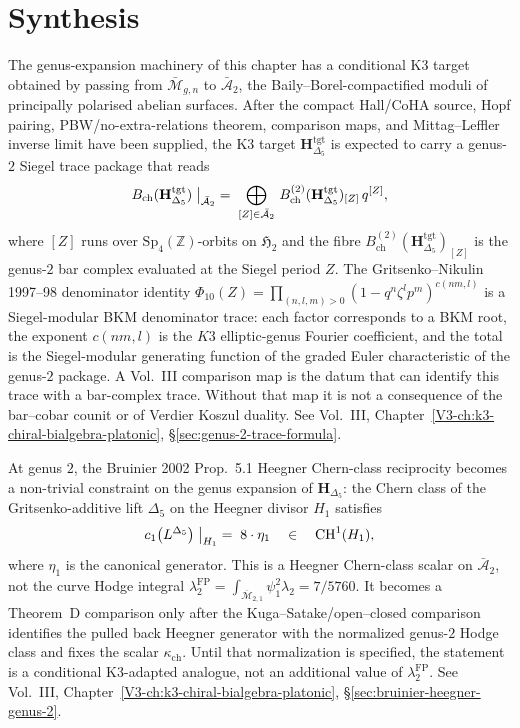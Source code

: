 \section{Synthesis}
\label{sec:gexp-supplement}

\begin{remark}
\label{rem:gexp-1}
The genus-expansion machinery of this chapter has a conditional K3
target obtained by passing from $\bar{\mathcal M}_{g,n}$ to
$\bar{\mathcal A}_2$, the Baily--Borel-compactified moduli of
principally polarised abelian surfaces. After the compact Hall/CoHA
source, Hopf pairing, PBW/no-extra-relations theorem, comparison
maps, and Mittag--Leffler inverse limit have been supplied, the
K3 target $\mathbf H_{\Delta_5}^{\mathrm{tgt}}$ is expected to carry
a genus-$2$ Siegel trace package that reads
\[
B_{\mathrm{ch}}(\mathbf H_{\Delta_5}^{\mathrm{tgt}})\bigm|_{\bar{\mathcal A}_2}
\;=\; \bigoplus_{[Z]\in\bar{\mathcal A}_2}\, B_{\mathrm{ch}}^{(2)}(\mathbf H_{\Delta_5}^{\mathrm{tgt}})_{[Z]}\, q^{[Z]},
\]
where $[Z]$ runs over $\mathrm{Sp}_4(\mathbb Z)$-orbits on $\mathfrak H_2$
and the fibre $B^{(2)}_{\mathrm{ch}}(\mathbf H_{\Delta_5}^{\mathrm{tgt}})_{[Z]}$ is the
genus-$2$ bar complex evaluated at the Siegel period $Z$. The
Gritsenko--Nikulin 1997--98 denominator identity
$\Phi_{10}(Z) = \prod_{(n,l,m)>0}(1 - q^n\zeta^l p^m)^{c(nm,l)}$
is a Siegel-modular BKM denominator trace: each factor corresponds to
a BKM root, the exponent $c(nm,l)$ is the $K3$ elliptic-genus Fourier
coefficient, and the total is the Siegel-modular generating function
of the graded Euler characteristic of the genus-$2$ package. A Vol.~III
comparison map is the datum that can identify this trace with a
bar-complex trace. Without that map it is not a consequence of the
bar--cobar counit or of Verdier Koszul duality. See Vol.~III,
Chapter~\ref{V3-ch:k3-chiral-bialgebra-platonic},
\S\ref{sec:genus-2-trace-formula}.
\end{remark}

\begin{remark}
\label{rem:gexp-2}
At genus $2$, the Bruinier 2002 Prop.~5.1 Heegner Chern-class
reciprocity becomes a non-trivial constraint on the genus expansion
of $\mathbf H_{\Delta_5}$: the Chern class of the Gritsenko-additive
lift $\Delta_5$ on the Heegner divisor $H_1$ satisfies
\[
c_1\bigl(L^{\Delta_5}\bigr)\bigm|_{H_1}
\;=\; 8\cdot \eta_1
\quad\in\quad \mathrm{CH}^1(H_1),
\]
where $\eta_1$ is the canonical generator. This is a Heegner
Chern-class scalar on $\bar{\mathcal A}_2$, not the curve Hodge
integral
$\lambda_2^{\mathrm{FP}}=\int_{\overline{\mathcal M}_{2,1}}
\psi_1^2\lambda_2=7/5760$. It becomes a Theorem~D comparison only
after the Kuga--Satake/open--closed comparison identifies the pulled
back Heegner generator with the normalized genus-$2$ Hodge class and
fixes the scalar $\kappa_{\mathrm{ch}}$. Until that normalization is
specified, the statement is a conditional K3-adapted analogue, not an
additional value of $\lambda_2^{\mathrm{FP}}$. See Vol.~III,
Chapter~\ref{V3-ch:k3-chiral-bialgebra-platonic},
\S\ref{sec:bruinier-heegner-genus-2}.
\end{remark}
